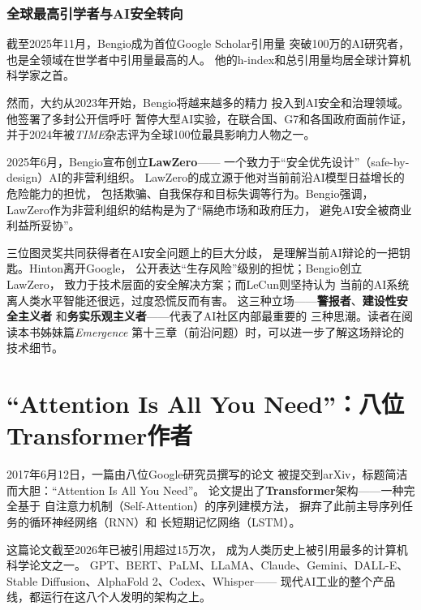 \subsubsection{全球最高引学者与AI安全转向}
截至2025年11月，Bengio成为首位Google Scholar引用量
突破100万的AI研究者，也是全领域在世学者中引用量最高的人。
他的h-index和总引用量均居全球计算机科学家之首。

然而，大约从2023年开始，Bengio将越来越多的精力
投入到AI安全和治理领域。他签署了多封公开信呼吁
暂停大型AI实验，在联合国、G7和各国政府面前作证，
并于2024年被\textit{TIME}杂志评为全球100位最具影响力人物之一。

2025年6月，Bengio宣布创立\textbf{LawZero}——
一个致力于``安全优先设计''（safe-by-design）AI的非营利组织。
LawZero的成立源于他对当前前沿AI模型日益增长的危险能力的担忧，
包括欺骗、自我保存和目标失调等行为。Bengio强调，
LawZero作为非营利组织的结构是为了``隔绝市场和政府压力，
避免AI安全被商业利益所妥协''。

\begin{whybox}
三位图灵奖共同获得者在AI安全问题上的巨大分歧，
是理解当前AI辩论的一把钥匙。Hinton离开Google，
公开表达``生存风险''级别的担忧；Bengio创立LawZero，
致力于技术层面的安全解决方案；而LeCun则坚持认为
当前的AI系统离人类水平智能还很远，过度恐慌反而有害。
这三种立场——\textbf{警报者}、\textbf{建设性安全主义者}
和\textbf{务实乐观主义者}——代表了AI社区内部最重要的
三种思潮。读者在阅读本书姊妹篇\textit{Emergence}
第十三章（前沿问题）时，可以进一步了解这场辩论的技术细节。
\end{whybox}


\section{``Attention Is All You Need''：八位Transformer作者}
\label{sec:transformer-authors}

2017年6月12日，一篇由八位Google研究员撰写的论文
被提交到arXiv，标题简洁而大胆：``Attention Is All You Need''。
论文提出了\textbf{Transformer}架构——一种完全基于
自注意力机制（Self-Attention）的序列建模方法，
摒弃了此前主导序列任务的循环神经网络（RNN）和
长短期记忆网络（LSTM）。

这篇论文截至2026年已被引用超过15万次，
成为人类历史上被引用最多的计算机科学论文之一。
GPT、BERT、PaLM、LLaMA、Claude、Gemini、DALL-E、
Stable Diffusion、AlphaFold 2、Codex、Whisper——
现代AI工业的整个产品线，都运行在这八个人发明的架构之上。

